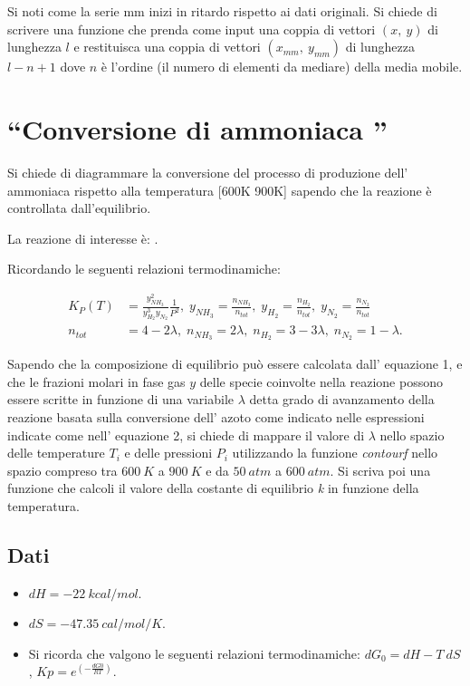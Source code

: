\documentclass[oneside]{article}
\begin{document}
Si noti come la serie mm inizi in ritardo rispetto ai dati originali. Si chiede di
scrivere una funzione che prenda come input una coppia di vettori $(x, \: y)$ di
lunghezza $l$ e restituisca una coppia di vettori $(x_{mm}, \: y_{mm})$ di lunghezza
$l-n+1$ dove $n$ è l'ordine (il numero di elementi da mediare) della media mobile.

\section{``Conversione di ammoniaca ''}
Si chiede di diagrammare la conversione del processo di produzione dell' ammoniaca
rispetto alla temperatura [600K 900K]  sapendo che la reazione è controllata
dall’equilibrio.

La reazione di interesse è: .

Ricordando le seguenti relazioni termodinamiche:

\begin{align}
   K_P (T)  &= \frac{y_{NH_3}^2}{y_{H_2}^{3} y_{N_2}} \frac{1}{P^2}, \; y_{NH_3} =
   \frac{n_{NH_3}}{n_{tot}}, \; y_{H_2}  = \frac{n_{H_2}}{n_{tot}}, \; y_{N_2}  =
   \frac{n_{N_2}}{n_{tot}} \\
   n_{tot} &= 4 - 2\lambda, \; n_{NH_3} = 2\lambda, \; n_{H_2} = 3 - 3\lambda, \; n_{N_2}
   = 1 - \lambda.
\end{align}

Sapendo che la composizione di equilibrio può essere calcolata dall' equazione 1, e che
le frazioni molari in fase gas $y$ delle specie coinvolte nella reazione possono essere
scritte in funzione di una variabile $\lambda$ detta grado di avanzamento della reazione
basata sulla conversione dell' azoto come indicato nelle espressioni indicate come nell'
equazione 2, si chiede di mappare il valore di $\lambda$ nello spazio delle temperature
$T_i$ e delle pressioni $P_i$ utilizzando la funzione {\it contourf} nello spazio
compreso tra $600\:K$ a $900\:K$ e da $50\:atm$ a $600\:atm$. Si scriva poi una funzione
che calcoli il valore della costante di equilibrio {\it k} in funzione della temperatura.

\subsection*{Dati}
\begin{itemize}
   \item $dH = -22 \: kcal/mol$.
   \item $dS = -47.35 \: cal/mol/K$.
   \item Si ricorda che valgono le seguenti relazioni termodinamiche: $dG_{0} = dH - T \:
      dS$, $Kp = e^{\left( -\frac{dG0}{RT} \right)}$.
\end{itemize}
\end{document}
